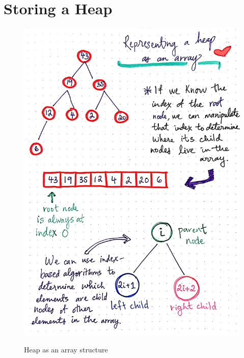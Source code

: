	\section{Storing a Heap}
	\begin{figure}[H]
		\centering
		\scalebox{0.40}
			{\includegraphics{images/heap_1}}
		\caption{Heap as an array structure}
	\end{figure}	
	
